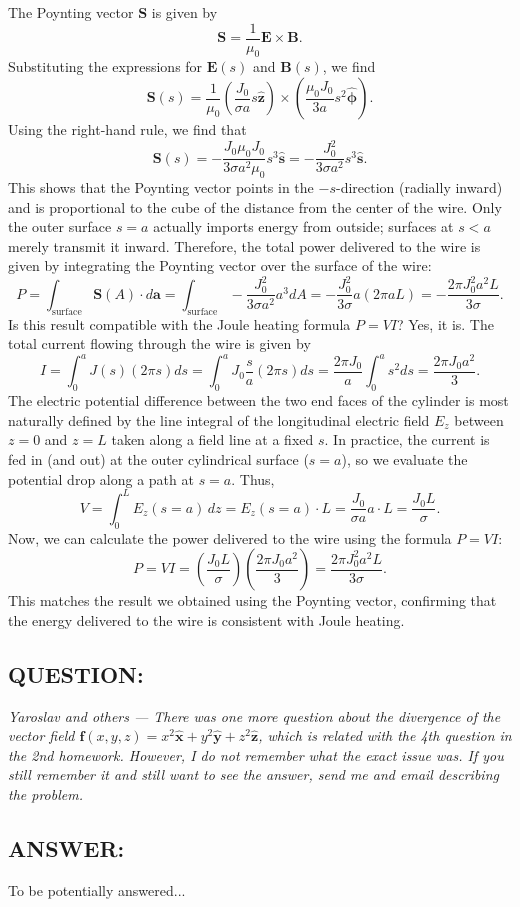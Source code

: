 \documentclass[12pt]{article}
\begin{document}
\noindent
The Poynting vector \(\mathbf{S}\) is given by
\[
\mathbf{S} = \frac{1}{\mu_0}\mathbf{E} \times \mathbf{B}.
\]
\noindent
Substituting the expressions for \(\mathbf{E}(s)\) and \(\mathbf{B}(s)\), we find
\[
\mathbf{S}(s) = \frac{1}{\mu_0}\left(\frac{J_0}{\sigma a} s \hat{\mathbf{z}}\right) \times \left(\frac{\mu_{0} J_{0}}{3 a} s^{2} \hat{\boldsymbol\phi}\right).
\]
Using the right-hand rule, we find that
\[
\mathbf{S}(s) = -\frac{J_0 \mu_{0} J_{0}}{3 \sigma a^{2} \mu_0} s^{3} \hat{\mathbf{s}}=-\frac{J_0^{2}}{3 \sigma a^{2}} s^{3} \hat{\mathbf{s}}.
\]
This shows that the Poynting vector points in the $-s$-direction (radially inward) and is proportional to the cube of the distance from the center of the wire. Only the outer surface \(s=a\) actually imports energy from outside; surfaces at \(s<a\) merely transmit it inward. Therefore, the total power delivered to the wire is given by integrating the Poynting vector over the surface of the wire:
\[P = \int_{\text{surface}}\mathbf{S}(A) \cdot d\mathbf{a} = \int_{\text{surface}} -\frac{J_0^{2}}{3 \sigma a^{2}} a^{3}dA = -\frac{J_0^{2}}{3 \sigma} a (2\pi a L) = -\frac{2\pi J_0^{2} a^2 L}{3 \sigma}.
\]
\noindent
Is this result compatible with the Joule heating formula $P=VI$? Yes, it is. The total current flowing through the wire is given by
\[I = \int_{0}^{a} J(s) (2\pi s) ds = \int_{0}^{a} J_0 \frac{s}{a} (2\pi s) ds = \frac{2\pi J_0}{a} \int_{0}^{a} s^2 ds = \frac{2\pi J_0 a^2}{3}.\]
\noindent
The electric potential difference between the two end faces of the cylinder is most naturally defined by the line integral of the longitudinal electric field 
$E_z$ between $z=0$ and $z=L$ taken along a field line at a fixed $s$. In practice, the current is fed in (and out) at the outer cylindrical surface ($s=a$), so we evaluate the potential drop along a path at $s=a$. Thus,
\[
V = \int_{0}^{L} E_z(s=a)\, dz = E_z(s=a) \cdot L = \frac{J_0}{\sigma a} a \cdot L = \frac{J_0 L}{\sigma}.
\]
\noindent
Now, we can calculate the power delivered to the wire using the formula \(P = VI\):
\[
P = V I = \left(\frac{J_0 L}{\sigma}\right) \left(\frac{2\pi J_0 a^2}{3}\right) = \frac{2\pi J_0^2 a^2 L}{3 \sigma}.
\]
\noindent
This matches the result we obtained using the Poynting vector, confirming that the energy delivered to the wire is consistent with Joule heating.
\newpage
\subsection*{QUESTION:}
\emph{Yaroslav and others --- There was one more question about the divergence of the vector field $\mathbf{f}(x,y,z)= x^2 \hat{\mathbf{x}} + y^2 \hat{\mathbf{y}} + z^2 \hat{\mathbf{z}}$, which is related with the 4th question in the 2nd homework. However, I do not remember what the exact issue was. If you still remember it and still want to see the answer, send me and email describing the problem.}

\subsection*{ANSWER:}
To be potentially answered...
\end{document}
